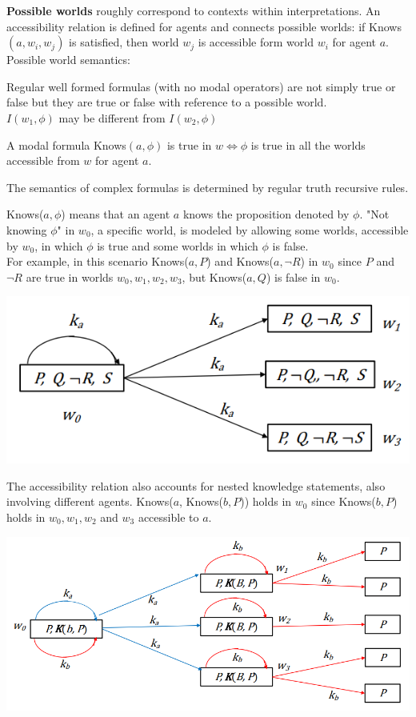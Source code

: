 \documentclass[10pt]{report}
\begin{document}
\textbf{Possible worlds} roughly correspond to contexts within interpretations. An accessibility relation is defined for agents and connects possible worlds: if Knows$(a, w_i, w_j)$ is satisfied, then world $w_j$ is accessible form world $w_i$ for agent $a$.\\
Possible world semantics:\begin{list}{}{}
	\item Regular well formed formulas (with no modal operators) are not simply true or false but they are true or false with reference to a possible world.\\
	$I(w_1, \phi)$ may be different from $I(w_2, \phi)$
	\item A modal formula Knows$(a, \phi)$ is true in $w \Leftrightarrow \phi$ is true in all the worlds accessible from $w$ for agent $a$.
	\item The semantics of complex formulas is determined by regular truth recursive rules.
\end{list}
Knows($a, \phi$) means that an agent $a$ knows the proposition denoted by $\phi$. "Not knowing $\phi$" in $w_0$, a specific world, is modeled by allowing some worlds, accessible by $w_0$, in which $\phi$ is true and some worlds in which $\phi$ is false.\\
For example, in this scenario Knows($a,P$) and Knows($a, \neg R$) in $w_0$ since $P$ and $\neg R$ are true in worlds $w_0,w_1,w_2,w_3$, but Knows($a, Q$) is false in $w_0$.
\begin{center}
	\includegraphics[scale=0.5]{15.png}
\end{center}
The accessibility relation also accounts for nested knowledge statements, also involving different agents. Knows($a$, Knows($b,P$)) holds in $w_0$ since Knows($b, P$) holds in $w_0,w_1,w_2$ and $w_3$ accessible to $a$.
\begin{center}
	\includegraphics[scale=0.5]{16.png}
\end{center}
\end{document}
